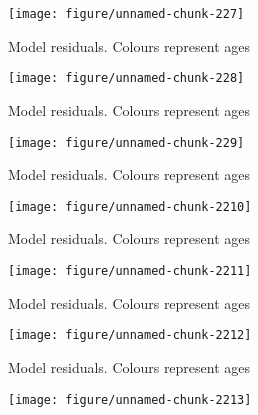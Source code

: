 \documentclass[a4paper]{article}\usepackage{graphicx, color}
\makeatletter
\def\maxwidth{ %
  \ifdim\Gin@nat@width>\linewidth
    \linewidth
  \else
    \Gin@nat@width
  \fi
}
\newenvironment{knitrout}{}{} %
\makeatother
\begin{document}
\begin{knitrout}
\begin{figure}[H]
{\centering \texttt{[image: figure/unnamed-chunk-227]} 

}

\caption[Model residuals]{Model residuals. Colours represent ages\label{fig:unnamed-chunk-227}}
\end{figure}
\begin{figure}[H]


{\centering \texttt{[image: figure/unnamed-chunk-228]} 

}

\caption[Model residuals]{Model residuals. Colours represent ages\label{fig:unnamed-chunk-228}}
\end{figure}
\begin{figure}[H]


{\centering \texttt{[image: figure/unnamed-chunk-229]} 

}

\caption[Model residuals]{Model residuals. Colours represent ages\label{fig:unnamed-chunk-229}}
\end{figure}
\begin{figure}[H]


{\centering \texttt{[image: figure/unnamed-chunk-2210]} 

}

\caption[Model residuals]{Model residuals. Colours represent ages\label{fig:unnamed-chunk-2210}}
\end{figure}
\begin{figure}[H]


{\centering \texttt{[image: figure/unnamed-chunk-2211]} 

}

\caption[Model residuals]{Model residuals. Colours represent ages\label{fig:unnamed-chunk-2211}}
\end{figure}
\begin{figure}[H]


{\centering \texttt{[image: figure/unnamed-chunk-2212]} 

}

\caption[Model residuals]{Model residuals. Colours represent ages\label{fig:unnamed-chunk-2212}}
\end{figure}
\begin{figure}[H]


{\centering \texttt{[image: figure/unnamed-chunk-2213]} 

}


\end{figure}
\end{knitrout}
\end{document}
